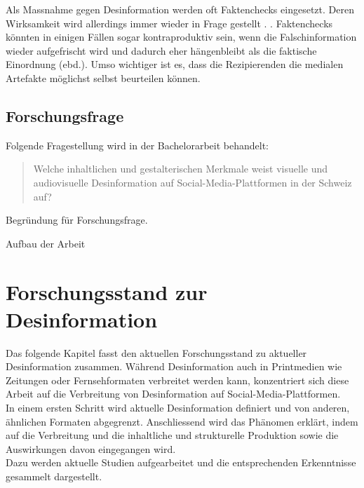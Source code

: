 \documentclass[12pt,a4paper]{article}        %
\begin{document}
Als Massnahme gegen Desinformation werden oft Faktenchecks eingesetzt. Deren Wirksamkeit wird allerdings immer wieder in Frage gestellt \parencites[1095]{lazer_science_2018}[4f]{ceron_fake_2021}.  \parencites[1095]{lazer_science_2018}\parencite[vgl.\ auch][18]{grujic_warnhinweise_2024}. Faktenchecks könnten in einigen Fällen sogar kontraproduktiv sein, wenn  die Falschinformation wieder aufgefrischt wird und dadurch eher hängenbleibt als die faktische Einordnung (ebd.). Umso wichtiger ist es, dass die Rezipierenden die medialen Artefakte möglichst selbst beurteilen können.

\subsection{Forschungsfrage}
Folgende Fragestellung wird in der Bachelorarbeit behandelt:

\begin{quote}
  Welche inhaltlichen und gestalterischen Merkmale weist visuelle und audiovisuelle Desinformation auf Social-Media-Plattformen in der Schweiz auf?
\end{quote}
\color{red}Begründung für Forschungsfrage.

\color{red}Aufbau der Arbeit 
\color{black}
\pagebreak
\section{Forschungsstand zur Desinformation}
Das folgende Kapitel fasst den aktuellen Forschungsstand zu aktueller Desinformation zusammen. Während Desinformation auch in Printmedien wie Zeitungen oder Fernsehformaten verbreitet werden kann, konzentriert sich diese Arbeit auf die Verbreitung von Desinformation auf Social-Media-Plattformen.\\
In einem ersten Schritt wird aktuelle Desinformation definiert und von anderen, ähnlichen Formaten abgegrenzt. Anschliessend wird das Phänomen erklärt, indem auf die Verbreitung und die inhaltliche und strukturelle Produktion sowie die Auswirkungen davon eingegangen wird. \\
Dazu werden aktuelle Studien aufgearbeitet und die entsprechenden Erkenntnisse gesammelt dargestellt.
\end{document}
